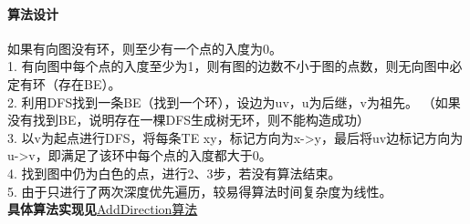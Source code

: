 \documentclass[11pt,a4paper,oneside,oldfontcommands]{ctexart}
\begin{document}
\paragraph{算法设计} 如果有向图没有环，则至少有一个点的入度为0。\\
1. 有向图中每个点的入度至少为1，则有图的边数不小于图的点数，则无向图中必定有环（存在BE）。\\
2. 利用DFS找到一条BE（找到一个环），设边为uv，u为后继，v为祖先。
（如果没有找到BE，说明存在一棵DFS生成树无环，则不能构造成功）\\
3. 以v为起点进行DFS，将每条TE xy，标记方向为x->y，最后将uv边标记方向为u->v，即满足了该环中每个点的入度都大于0。\\
4. 找到图中仍为白色的点，进行2、3步，若没有算法结束。\\
5. 由于只进行了两次深度优先遍历，较易得算法时间复杂度为线性。\\
\textbf{具体算法实现见}\hyperlink{AddDirection}{AddDirection算法}\\
\end{document}
